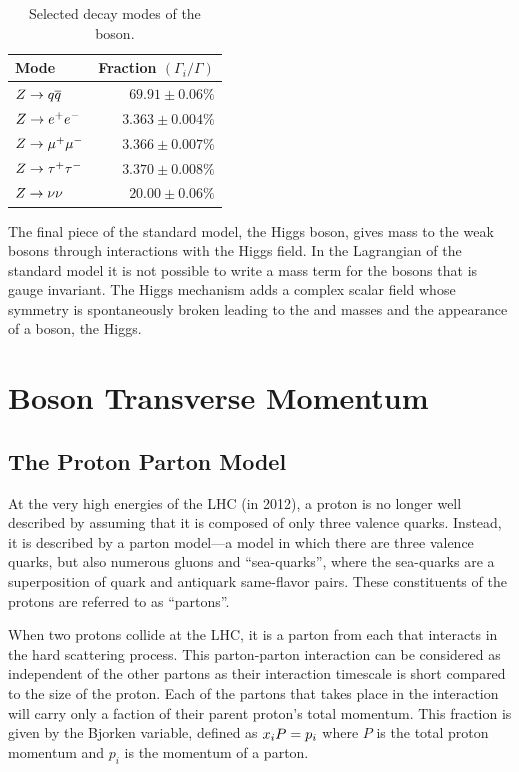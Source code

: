 \begin{table}[h]
\centering
{}
\begin{center}
    \begin{tabular}{@{}l  r@{}}
        \toprule
        Mode & Fraction $\left( \Gamma_{i} / \Gamma \right)$ \\
        \midrule
        $Z \to q \overline{q}$ & $69.91 \pm 0.06\%$ \\
        $Z \to e^{+} e^{-}$ & $3.363 \pm 0.004\%$ \\
        $Z \to \mu^{+} \mu^{-}$ & $3.366 \pm 0.007\%$ \\
        $Z \to \tau^{+} \tau^{-}$ & $3.370 \pm 0.008\%$ \\
        $Z \to \nu \nu$ & $20.00 \pm 0.06\%$ \\
        \bottomrule
    \end{tabular}
    \caption{
        Selected decay modes of the \Z boson.
    }
\label{table:z_decays}
\end{center}
\end{table}

The final piece of the standard model, the Higgs boson, gives mass to the weak
bosons through interactions with the Higgs field. In the Lagrangian of the
standard model it is not possible to write a mass term for the bosons
that is gauge invariant. The Higgs mechanism adds a complex scalar field whose
symmetry is spontaneously broken leading to the \W and \Z masses and the
appearance of a \spinzero boson, the Higgs.

\section{\texorpdfstring{\Z}{Z} Boson Transverse Momentum}

\subsection{The Proton Parton Model}
\label{ssec:parton_model}

At the very high energies of the LHC (\rootseight in 2012), a proton is no
longer well described by assuming that it is composed of only three valence
quarks. Instead, it is described by a parton model---a model in which there are
three valence quarks, but also numerous gluons and ``sea-quarks'', where the
sea-quarks are a superposition of quark and antiquark same-flavor pairs. These
constituents of the protons are referred to as ``partons''.

When two protons collide at the LHC, it is a parton from each that interacts in
the hard scattering process. This parton-parton interaction can be considered
as independent of the other partons as their interaction timescale is short
compared to the size of the proton. Each of the partons that takes place in the
interaction will carry only a faction of their parent proton's total momentum.
This fraction is given by the Bjorken  variable, defined as
$x_{i} P = p_{i}$ where $P$ is the total proton momentum and $p_{i}$ is the
momentum of a parton.

